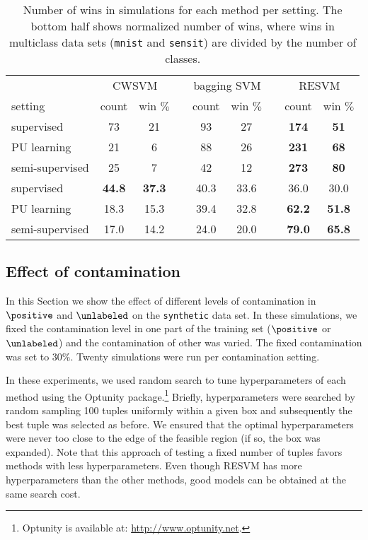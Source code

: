 \begin{table}[!h]
\centering
\begin{tabular}{lcccccccc}
\toprule
    & \multicolumn{2}{c}{CWSVM} & & \multicolumn{2}{c}{bagging SVM} & & \multicolumn{2}{c}{RESVM}\\ \cline{2-3} \cline{5-6} \cline{8-9}
setting         & count & win $\%$ & & count & win $\%$ & & count & win $\%$ \\
\midrule    
supervised      & 73    & 21 & & 93 & 27 & & \textbf{174} & \textbf{51} \\
PU learning     & 21     & 6  & & 88 & 26 & & \textbf{231} & \textbf{68} \\
semi-supervised  & 25    & 7  & & 42 & 12 & & \textbf{273} & \textbf{80}\\
\midrule
supervised      & \textbf{44.8} & \textbf{37.3} & & 40.3 & 33.6 & & 36.0 & 30.0 \\
PU learning     & 18.3  & 15.3 & & 39.4 & 32.8 & & \textbf{62.2} & \textbf{51.8} \\
semi-supervised  & 17.0  & 14.2 & & 24.0 & 20.0 & & \textbf{79.0} & \textbf{65.8} \\
\bottomrule
\end{tabular}
\caption{Number of wins in simulations for each method per setting. The bottom half shows normalized number of wins, where wins in multiclass data sets (\texttt{mnist} and \texttt{sensit}) are divided by the number of classes.}
\label{table:wins}
\end{table}


\subsection{Effect of contamination} \label{varycontamination}
In this Section we show the effect of different levels of contamination in $\positive$ and $\unlabeled$ on the \texttt{synthetic} data set. In these simulations, we fixed the contamination level in one part of the training set ($\positive$ or $\unlabeled$) and the contamination of other was varied. The fixed contamination was set to $30\%$. Twenty simulations were run per contamination setting.

In these experiments, we used random search to tune hyperparameters of each method \citep{bergstra2012random} using the Optunity package.\footnote{Optunity is available at: \url{http://www.optunity.net}.} Briefly, hyperparameters were searched by random sampling 100 tuples uniformly within a given box and subsequently the best tuple was selected as before. We ensured that the optimal hyperparameters were never too close to the edge of the feasible region (if so, the box was expanded). Note that this approach of testing a fixed number of tuples favors methods with less hyperparameters. Even though RESVM has more hyperparameters than the other methods, good models can be obtained at the same search cost.


